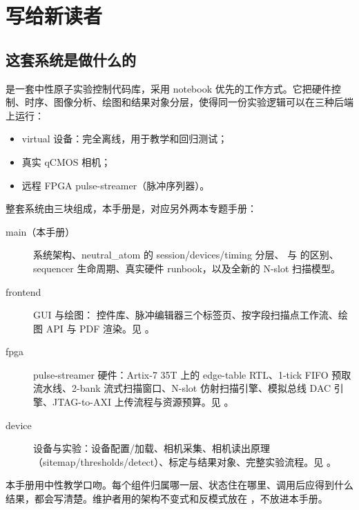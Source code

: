 \documentclass[11pt,oneside,openany]{book}
\begin{document}
\frontmatter
{}
\tableofcontents
\cleardoublepage
\mainmatter

\chapter{写给新读者}

\section{这套系统是做什么的}
 是一套中性原子实验控制代码库，采用 notebook 优先的工作方式。它把硬件控制、时序、图像分析、绘图和结果对象分层，使得同一份实验逻辑可以在三种后端上运行：

\begin{itemize}
  \item virtual 设备：完全离线，用于教学和回归测试；
  \item 真实 qCMOS 相机；
  \item 远程 FPGA pulse-streamer（脉冲序列器）。
\end{itemize}

整套系统由三块组成，本手册是，对应另外两本专题手册：

\begin{description}
  \item[main（本手册）] 系统架构、neutral\_atom 的 session/devices/timing 分层、 与  的区别、sequencer 生命周期、真实硬件 runbook，以及全新的 N-slot 扫描模型。
  \item[frontend] GUI 与绘图： 控件库、脉冲编辑器三个标签页、按字段扫描点工作流、绘图 API 与 PDF 渲染。见 。
  \item[fpga] pulse-streamer 硬件：Artix-7 35T 上的 edge-table RTL、1-tick FIFO 预取流水线、2-bank 流式扫描窗口、N-slot 仿射扫描引擎、模拟总线 DAC 引擎、JTAG-to-AXI 上传流程与资源预算。见 。
  \item[device] 设备与实验：设备配置/加载、相机采集、相机读出原理（sitemap/thresholds/detect）、标定与结果对象、完整实验流程。见 。
\end{description}

\begin{notebox}[阅读约定]
本手册用中性教学口吻。每个组件归属哪一层、状态住在哪里、调用后应得到什么结果，都会写清楚。维护者用的架构不变式和反模式放在 ，不放进本手册。
\end{notebox}
\end{document}
